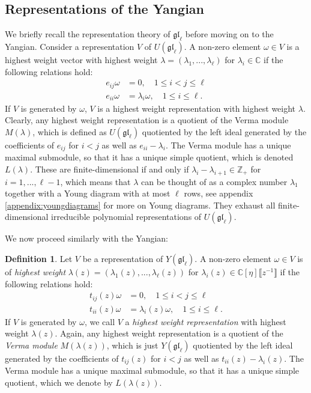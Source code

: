 \documentclass[11pt]{report}
\theoremstyle{definition}
\newtheorem{definition}[theorem]{Definition}
\theoremstyle{remark}
\theoremstyle{remark}
\newcommand{\Z}{\mathbb{Z}}
\newcommand{\C}{\mathbb{C}}
\begin{document}
\subsection{Representations of the Yangian}

We briefly recall the representation theory of $\mathfrak{gl}_\ell$ before moving on to the Yangian. Consider a representation $V$ of $U(\mathfrak{gl}_\ell)$. A non-zero element $\omega \in V$ is a highest weight vector with highest weight $\lambda = (\lambda_1,...,\lambda_\ell)$ for $\lambda_i \in \C$ if the following relations hold:
\begin{align*}
e_{ij} \omega &= 0, \quad 1 \leq i < j \leq \ell \\
e_{ii} \omega &= \lambda_i \omega, \quad 1 \leq i \leq \ell.
\end{align*}
If $V$ is generated by $\omega$, $V$ is a highest weight representation with highest weight $\lambda$. Clearly, any highest weight representation is a quotient of the Verma module $M(\lambda)$, which is defined as $U(\mathfrak{gl}_\ell)$ quotiented by the left ideal generated by the coefficients of $e_{ij}$ for $i<j$ as well as $e_{ii} - \lambda_i$. The Verma module has a unique maximal submodule, so that it has a unique simple quotient, which is denoted $L(\lambda)$. These are finite-dimensional if and only if $\lambda_i - \lambda_{i+1} \in \Z_+$ for $i=1,...,\ell-1$, which means that $\lambda$ can be thought of as a complex number $\lambda_1$ together with a Young diagram with at most $\ell$ rows, see appendix \ref{appendix:youngdiagrams} for more on Young diagrams. They exhaust all finite-dimensional irreducible polynomial representations of $U(\mathfrak{gl}_\ell)$.

We now proceed similarly with the Yangian:

\begin{definition}
Let $V$ be a representation of $Y(\mathfrak{gl}_\ell)$. A non-zero element $\omega \in V$ is of \emph{highest weight} $\lambda(z) = (\lambda_1(z),...,\lambda_\ell(z))$ for $\lambda_i(z) \in \C[\eta]\llbracket z^{-1} \rrbracket$ if the following relations hold:
\begin{align*}
t_{ij}(z) \omega &= 0, \quad 1 \leq i < j \leq \ell \\
t_{ii}(z) \omega &= \lambda_i(z) \omega, \quad 1 \leq i \leq \ell.
\end{align*}
If $V$ is generated by $\omega$, we call $V$ a \emph{highest weight representation} with highest weight $\lambda(z)$. Again, any highest weight representation is a quotient of the \emph{Verma module} $M(\lambda(z))$, which is just $Y(\mathfrak{gl}_\ell)$ quotiented by the left ideal generated by the coefficients of $t_{ij}(z)$ for $i<j$ as well as $t_{ii}(z) - \lambda_i(z)$. The Verma module has a unique maximal submodule, so that it has a unique simple quotient, which we denote by $L(\lambda(z))$.
\end{definition}
\end{document}
